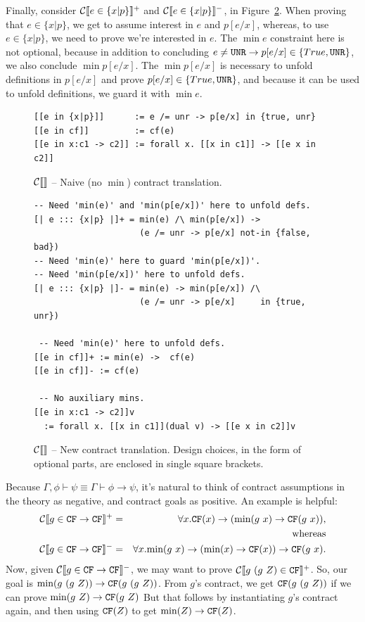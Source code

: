 \documentclass[preprint]{sigplanconf}
\begin{document}
{Finally, consider $\mathcal{C} \llbracket e \in \{x|p\} \rrbracket^+$ and $\mathcal{C} \llbracket e \in \{x|p\} \rrbracket^-$, in
Figure~\ref{fig:newCTrans}.  When proving that $e \in \{x|p\}$, we get to
assume interest in $e$ and $p[e/x]$, whereas, to use $e \in \{x|p\}$,
we need to prove we're interested in $e$.  The $\min{e}$ constraint
here is not optional, because in addition to concluding 
$e \neq \texttt{UNR} \to p[e/x] \in \{True,\texttt{UNR}\}$, we also conclude $\min{p[e/x]}$.
The $\min{p[e/x]}$ is necessary to unfold definitions in $p[e/x]$ and prove
$p[e/x] \in \{True,\texttt{UNR}\}$, and because it can be used to unfold definitions,
we guard it with $\min{e}$.
}

\begin{figure}
\begin{verbatim}
[[e in {x|p}]]      := e /= unr -> p[e/x] in {true, unr}
[[e in cf]]         := cf(e)
[[e in x:c1 -> c2]] := forall x. [[x in c1]] -> [[e x in c2]]
\end{verbatim}
\caption{$\mathcal{C} \llbracket  \rrbracket$ -- Naive (no $\min$) contract translation.}
\label{fig:naiveCTrans}
\end{figure}

\begin{figure}
\begin{verbatim}
-- Need 'min(e)' and 'min(p[e/x])' here to unfold defs.
[| e ::: {x|p} |]+ = min(e) /\ min(p[e/x]) ->
                     (e /= unr -> p[e/x] not-in {false, bad})
-- Need 'min(e)' here to guard 'min(p[e/x])'.
-- Need 'min(p[e/x])' here to unfold defs.
[| e ::: {x|p} |]- = min(e) -> min(p[e/x]) /\
                     (e /= unr -> p[e/x]     in {true, unr})

 -- Need 'min(e)' here to unfold defs.
[[e in cf]]+ := min(e) ->  cf(e)
[[e in cf]]- := cf(e)

 -- No auxiliary mins.
[[e in x:c1 -> c2]]v
  := forall x. [[x in c1]](dual v) -> [[e x in c2]]v
\end{verbatim}
\caption{$\mathcal{C} \llbracket  \rrbracket$ -- New contract translation. Design choices, in the form
of optional parts, are enclosed in single square brackets.}
\label{fig:newCTrans}
\end{figure}

Because $\Gamma,\phi \vdash \psi \equiv \Gamma \vdash \phi \to \psi$,
it's natural to think of contract assumptions in the theory as
negative, and contract goals as positive.  An example is helpful:
\protect \begin{eqnarray*}
\mathcal{C} \llbracket g \in \texttt{CF} \to \texttt{CF} \rrbracket^+ &=& \forall x. \texttt{CF}(x) \to (\mbox{min}(g ~x) \to \texttt{CF}(g ~x)),\\
&&\text{whereas}\\
\mathcal{C} \llbracket g \in \texttt{CF} \to \texttt{CF} \rrbracket^- &=& \forall x. \mbox{min}(g ~x) \to (\mbox{min}(x) \to \texttt{CF}(x)) \to \texttt{CF}(g ~x).
\end{eqnarray*}
Now, given $\mathcal{C} \llbracket g \in \texttt{CF} \to \texttt{CF} \rrbracket^-$, we may 
want to prove $\mathcal{C} \llbracket g ~(g ~Z) \in \texttt{CF} \rrbracket^+$.
So, our goal is $\mbox{min}(g ~(g ~Z)) \to \texttt{CF}(g ~(g ~Z))$.
From $g$'s contract, we get $\texttt{CF}(g ~(g ~Z))$ if we can prove 
$\mbox{min}(g ~Z) \to \texttt{CF}(g ~Z)$
But that follows by instantiating $g$'s contract again, and 
then using $\texttt{CF}(Z)$ to get $\mbox{min}(Z) \to \texttt{CF}(Z)$.
\end{document}
